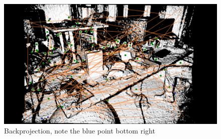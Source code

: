 \begin{figure}[H]
    \includegraphics[width=\linewidth]{chapter06/results/SIFT/flexion/backprojected-0010.png}%
    \caption{Backprojection, note the blue point bottom right}
\end{figure}
